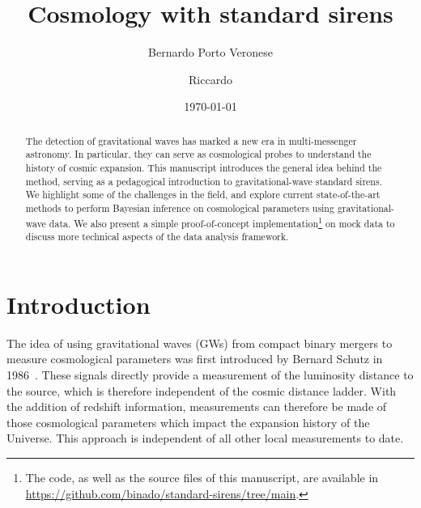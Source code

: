 \documentclass[%
preprint,
nofootinbib,
 amsmath,amssymb,
 aps,
]{revtex4-2}
\begin{document}

\title{Cosmology with standard sirens}

\author{Bernardo Porto Veronese}
\author{Riccardo}
%


\date{\today}%

\begin{abstract}
	The detection of gravitational waves has marked a new era in multi-messenger astronomy.
	In particular, they can serve as cosmological probes to understand the history of cosmic expansion.
	This manuscript introduces the general idea behind the method, serving as a pedagogical introduction to gravitational-wave standard sirens.
	We highlight some of the challenges in the field, and explore current
	state-of-the-art methods to perform Bayesian inference on cosmological parameters using gravitational-wave data.
	We also present a simple proof-of-concept implementation\footnote{The code, as well as the source files of this manuscript, are available in \url{https://github.com/binado/standard-sirens/tree/main}.}
	on mock data to discuss more technical aspects of the data analysis framework.
\end{abstract}

\maketitle

\tableofcontents

\section{\label{sec:introduction}Introduction} The idea of using gravitational waves (GWs) from compact binary mergers to measure
cosmological parameters was first introduced by Bernard Schutz in 1986~\cite{Schutz:1986gp}. These
signals directly provide a measurement of the luminosity distance to the source, which is therefore
independent of the cosmic distance ladder. With the addition of redshift information, measurements
can therefore be made of those cosmological parameters which impact the expansion history of the
Universe. This approach is independent of all other local measurements to date.
\end{document}
